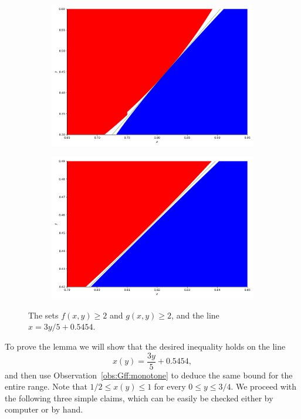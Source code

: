 \documentclass[12pt,reqno]{amsart}
\theoremstyle{definition}
\theoremstyle{remark}
\renewcommand{\le}{\leqslant}
\renewcommand{\ge}{\geqslant}
\begin{document}
\begin{figure}[h]
  \centering
    \begin{subfigure}[b]{0.47\textwidth}
    \includegraphics[width=\textwidth]{Figure_diagonal_jump_line.jpeg}
  \end{subfigure}
  \hspace{0.5cm}
  \begin{subfigure}[b]{0.47\textwidth}
    \includegraphics[width=\textwidth]{Figure_diagonal_zoomed_line.jpeg}
  \end{subfigure}
  \caption{The sets $f(x,y) \ge 2$ and $g(x,y) \ge 2$, and the line $x = 3y/5 + 0.5454$.}
  \label{fig:diagonal:app}
\end{figure}

To prove the lemma we will show that the desired inequality holds on the line 
\begin{equation}\label{def:x:of:y}
x(y) = \frac{3y}{5} + 0.5454,
\end{equation}
and then use Observation~\ref{obs:Gff:monotone} to deduce the same bound for the entire range. Note that $1/2 \le x(y) \le 1$ for every $0 \le y \le 3/4$. We proceed with the following three simple claims, which can be easily be checked either by computer or by hand.
\end{document}
